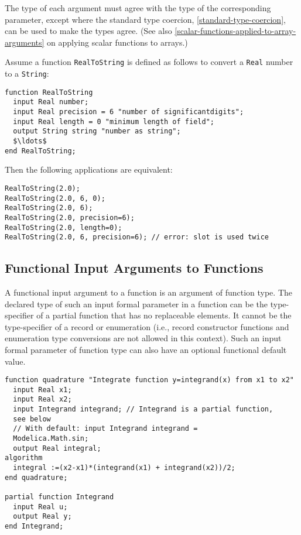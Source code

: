 The type of each argument must agree with the type of the corresponding
parameter, except where the standard type coercion, \cref{standard-type-coercion}, can be used to make
the types agree. (See also \cref{scalar-functions-applied-to-array-arguments} on applying scalar functions
to arrays.)

\begin{example}
Assume a function \lstinline!RealToString! is defined as follows to
convert a \lstinline!Real! number to a \lstinline!String!:
\begin{lstlisting}[language=modelica]
function RealToString
  input Real number;
  input Real precision = 6 "number of significantdigits";
  input Real length = 0 "minimum length of field";
  output String string "number as string";
  $\ldots$
end RealToString;
\end{lstlisting}
Then the following applications are equivalent:
\begin{lstlisting}[language=modelica]
RealToString(2.0);
RealToString(2.0, 6, 0);
RealToString(2.0, 6);
RealToString(2.0, precision=6);
RealToString(2.0, length=0);
RealToString(2.0, 6, precision=6); // error: slot is used twice
\end{lstlisting}
\end{example}

\subsection{Functional Input Arguments to Functions}\label{functional-input-arguments-to-functions}

A functional input argument to a function is an argument of function
type. The declared type of such an input formal parameter in a function
can be the type-specifier of a partial function that has no replaceable
elements. It cannot be the type-specifier of a record or enumeration
(i.e., record constructor functions and enumeration type
conversions are not allowed in this context). Such an input formal
parameter of function type can also have an optional functional default
value.

\begin{example}
\begin{lstlisting}[language=modelica]
function quadrature "Integrate function y=integrand(x) from x1 to x2"
  input Real x1;
  input Real x2;
  input Integrand integrand; // Integrand is a partial function,
  see below
  // With default: input Integrand integrand =
  Modelica.Math.sin;
  output Real integral;
algorithm
  integral :=(x2-x1)*(integrand(x1) + integrand(x2))/2;
end quadrature;

partial function Integrand
  input Real u;
  output Real y;
end Integrand;
\end{lstlisting}
\end{example}


